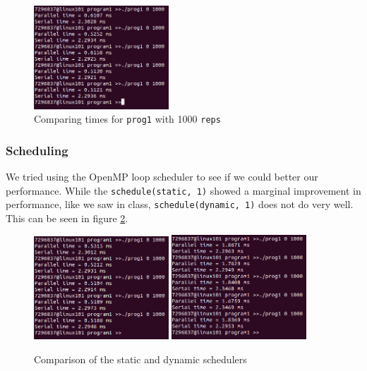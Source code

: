 \documentclass{article}
\begin{document}
\begin{figure}[ht]
    \centering
    \includegraphics[width=0.45\textwidth]{prog1_timing.png}
    \caption{Comparing times for \texttt{prog1} with 1000 \texttt{reps}}
    \label{fig:prog1_timing}
\end{figure}

\subsubsection{Scheduling}
We tried using the OpenMP loop scheduler to see if we could better our performance. While the \texttt{schedule(static, 1)} showed a marginal improvement in performance, like we saw in class, \texttt{schedule(dynamic, 1)} does not do very well. This can be seen in figure \ref{fig:prog1_static_dynamic}. 

\begin{figure}[ht]
	\centering
    \includegraphics[width=0.45\textwidth]{prog1_timing_static.png}\quad
    \includegraphics[width=0.45\textwidth]{prog1_timing_dynamic.png}\quad
    \caption{Comparison of the static and dynamic schedulers}
    \label{fig:prog1_static_dynamic}
\end{figure}
\end{document}
